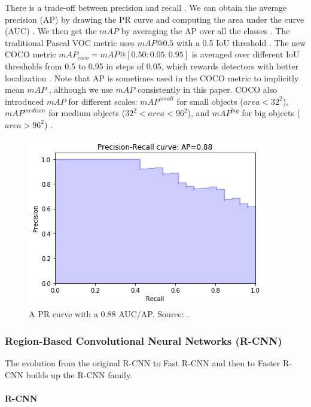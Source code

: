 \documentclass[a4paper, 11pt, oneside]{article}
\begin{document}
There is a trade-off between precision and recall
\cite{elgendy2020deep, geron2019hands, burkov2019hundred, planche2019hands}. We can obtain the average precision
(AP) by drawing the PR curve and computing the area under the curve (AUC) \cite{elgendy2020deep, planche2019hands}.
We then get the $mAP$ by averaging the AP over all the classes \cite{elgendy2020deep, geron2019hands, planche2019hands}.
The traditional Pascal VOC metric uses $mAP@0.5$ with a 0.5 IoU threshold \cite{liu2020deep, everingham2010pascal}.
The new COCO metric $mAP_{coco} = mAP@[0.50:0.05:0.95]$ is averaged over
different IoU thresholds from 0.5 to 0.95 in steps of 0.05, which rewards detectors with better localization
\cite{liu2020deep, cocometrics}. Note that AP is sometimes used in the COCO metric to implicitly mean $mAP$
\cite{cocometrics}, although we use $mAP$ consistently in this paper. COCO also introduced $mAP$ for different scales:
$mAP^{small}$ for small objects ($area < 32^2$), $mAP^{medium}$ for medium objects ($32^2 < area < 96^2$),
and $mAP^{big}$ for big objects ($area > 96^2$) \cite{liu2020deep, cocometrics}.

\begin{figure}[ht]
  \begin{center}
    \includegraphics[width=.5\textwidth]{pr_curve.png}
  \end{center}
  \caption{A PR curve with a 0.88 AUC/AP. Source: \cite{planche2019hands}.}
\end{figure}

\subsubsection{Region-Based Convolutional Neural Networks (R-CNN)}

The evolution from the original R-CNN \cite{girshick2014rich} to Fast R-CNN \cite{girshick2015fast} and then to
Faster R-CNN \cite{ren2015faster} builds up the R-CNN family.

\paragraph{R-CNN}
\end{document}
